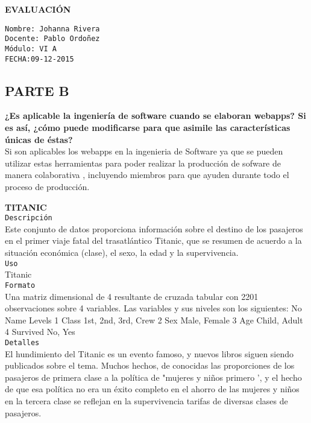 \documentclass[12pt,a4paper]{article}
\begin{document}

\author{Johanna}
\begin{center}
\textbf{EVALUACIÓN}
\end{center}
\texttt{Nombre: Johanna Rivera}\\
\texttt{Docente: Pablo Ordoñez}\\
\texttt{Módulo: VI A}\\
\texttt{FECHA:09-12-2015}\\

\begin{center}
\section*{PARTE B}
\end{center}
\textbf{¿Es aplicable la ingeniería de software cuando se elaboran webapps? Si es así, ¿cómo puede modificarse para que asimile las características únicas de éstas?}\\

Si son aplicables los webapps en la ingenieria de Software ya que se pueden utilizar estas herramientas para poder realizar la producción de sofware de manera colaborativa , incluyendo miembros  para que ayuden durante todo el proceso de producción.

\textbf{TITANIC}\\

\texttt{Descripción}\\

Este conjunto de datos proporciona información sobre el destino de los pasajeros en el primer viaje fatal del trasatlántico Titanic, que se resumen de acuerdo a la situación económica (clase), el sexo, la edad y la supervivencia.\\

\texttt{Uso}\\
Titanic\\

\texttt{Formato}\\

Una matriz dimensional de 4 resultante de cruzada tabular con 2201 observaciones sobre 4 variables. Las variables y sus niveles son los siguientes:
No 	Name 	Levels
1 	Class 	1st, 2nd, 3rd, Crew
2 	Sex 	Male, Female
3 	Age 	Child, Adult
4 	Survived 	No, Yes\\

\texttt{Detalles}\\

El hundimiento del Titanic es un evento famoso, y nuevos libros siguen siendo publicados sobre el tema. Muchos hechos,  de conocidas las proporciones de los pasajeros de primera clase a la política de "mujeres y niños primero ', y el hecho de que esa política no era un éxito completo en el ahorro de las mujeres y niños en la tercera clase se reflejan en la supervivencia tarifas de diversas clases de pasajeros.
\end{document}
